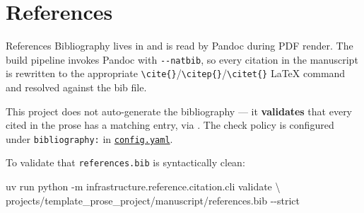 \documentclass[
  ignorenonframetext,
]{beamer}
\author{\texorpdfstring{}{}}
\date{}
\newenvironment{Shaded}{}{}
\newcommand{\AttributeTok}[1]{\textcolor[rgb]{0.49,0.56,0.16}{#1}}
\newcommand{\DataTypeTok}[1]{\textcolor[rgb]{0.56,0.13,0.00}{#1}}
\newcommand{\ExtensionTok}[1]{#1}
\newcommand{\NormalTok}[1]{#1}
\begin{document}
\section{References}\label{sec:references}

\begin{frame}{References}
Bibliography lives in
\href{references.bib}{} and is read by
Pandoc during PDF render. The build pipeline invokes Pandoc with
\texttt{-\/-natbib}, so every \texttt{\breakseq{[@key]}} citation in the
manuscript is rewritten to the appropriate
\texttt{\textbackslash{}cite\{\}}/\texttt{\textbackslash{}citep\{\}}/\texttt{\textbackslash{}citet\{\}}
LaTeX command and resolved against the bib file.

This project does not auto-generate the bibliography --- it
\textbf{validates} that every \texttt{\breakseq{[@key]}} cited in the prose has
a matching entry, via
\href{../../../infrastructure/reference/citation/SKILL.md}{}.
The check policy is configured under \texttt{bibliography:} in
\href{config.yaml}{\texttt{config.yaml}}.

To validate that \texttt{references.bib} is syntactically clean:

\begin{Shaded}
\begin{Highlighting}[]
\ExtensionTok{uv}\NormalTok{ run python }\AttributeTok{{-}m}\NormalTok{ infrastructure.reference.citation.cli validate }\DataTypeTok{\textbackslash{}}
\NormalTok{    projects/template\_prose\_project/manuscript/references.bib }\AttributeTok{{-}{-}strict}
\end{Highlighting}
\end{Shaded}
\end{frame}
\end{document}
